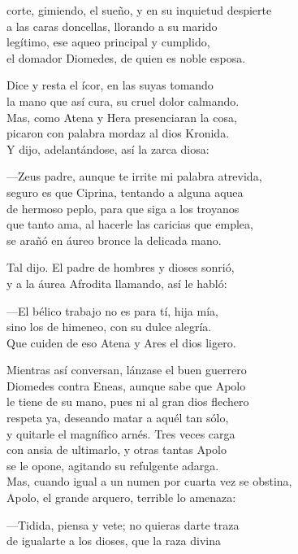 corte, gimiendo, el sueño, y en su inquietud despierte\\
a las caras doncellas, llorando a su marido\\
legítimo, ese aqueo principal y cumplido,\\
el domador Diomedes, de quien es noble esposa.\par
Dice y resta el ícor, en las suyas tomando\\
la mano que así cura, su cruel dolor calmando.\\
Mas, como Atena y Hera presenciaran la cosa,\\
picaron con palabra mordaz al dios Kronida.\\
Y dijo, adelantándose, así la zarca diosa:\par
---Zeus padre, aunque te irrite mi palabra atrevida,\\
seguro es que Ciprina, tentando a alguna aquea\\
de hermoso peplo, para que siga a los troyanos\\
que tanto ama, al hacerle las caricias que emplea,\\
se arañó en áureo bronce la delicada mano.\par
Tal dijo. El padre de hombres y dioses sonrió,\\
y a la áurea Afrodita llamando, así le habló:\par
---El bélico trabajo no es para tí, hija mía,\\
sino los de himeneo, con su dulce alegría.\\
Que cuiden de eso Atena y Ares el dios ligero.\par
Mientras así conversan, lánzase el buen guerrero\\
Diomedes contra Eneas, aunque sabe que Apolo\\
le tiene de su mano, pues ni al gran dios flechero\\
respeta ya, deseando matar a aquél tan sólo,\\
y quitarle el magnífico arnés. Tres veces carga\\
con ansia de ultimarlo, y otras tantas Apolo\\
se le opone, agitando su refulgente adarga.\\
Mas, cuando igual a un numen por cuarta vez se obstina,\\
Apolo, el grande arquero, terrible lo amenaza:\par
---Tidida, piensa y vete; no quieras darte traza\\
de igualarte a los dioses, que la raza divina\\
